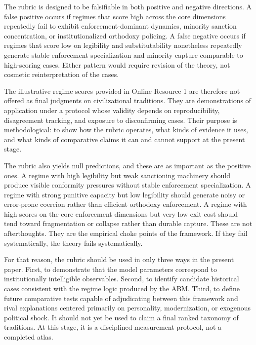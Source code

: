 \documentclass[12pt]{article}
\begin{document}
The rubric is designed to be falsifiable in both positive and negative directions. A false positive occurs if regimes that score high across the core dimensions repeatedly fail to exhibit enforcement-dominant dynamics, minority sanction concentration, or institutionalized orthodoxy policing. A false negative occurs if regimes that score low on legibility and substitutability nonetheless repeatedly generate stable enforcement specialization and minority capture comparable to high-scoring cases. Either pattern would require revision of the theory, not cosmetic reinterpretation of the cases.

The illustrative regime scores provided in Online Resource 1 are therefore not offered as final judgments on civilizational traditions. They are demonstrations of application under a protocol whose validity depends on reproducibility, disagreement tracking, and exposure to disconfirming cases. Their purpose is methodological: to show how the rubric operates, what kinds of evidence it uses, and what kinds of comparative claims it can and cannot support at the present stage.

The rubric also yields null predictions, and these are as important as the positive ones. A regime with high legibility but weak sanctioning machinery should produce visible conformity pressures without stable enforcement specialization. A regime with strong punitive capacity but low legibility should generate noisy or error-prone coercion rather than efficient orthodoxy enforcement. A regime with high scores on the core enforcement dimensions but very low exit cost should tend toward fragmentation or collapse rather than durable capture. These are not afterthoughts. They are the empirical choke points of the framework. If they fail systematically, the theory fails systematically.

For that reason, the rubric should be used in only three ways in the present paper. First, to demonstrate that the model parameters correspond to institutionally intelligible observables. Second, to identify candidate historical cases consistent with the regime logic produced by the ABM. Third, to define future comparative tests capable of adjudicating between this framework and rival explanations centered primarily on personality, modernization, or exogenous political shock. It should not yet be used to claim a final ranked taxonomy of traditions. At this stage, it is a disciplined measurement protocol, not a completed atlas.


\end{document}
